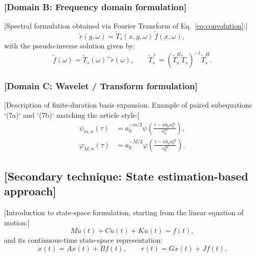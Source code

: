 \documentclass[final,5p,times,twocolumn]{elsarticle}
\begin{document}
\subsubsection{[Domain B: Frequency domain formulation]}\label{subsubsec:sec2_1_2}

[Spectral formulation obtained via Fourier Transform of Eq.~\eqref{eq:convolution}:]
\begin{equation}\label{eq:freq}
    \tilde{r}(y,\omega) = \tilde{T}_{s}(x,y,\omega)\,\tilde{f}(x,\omega),
\end{equation}
with the pseudo-inverse solution given by:
\begin{equation}\label{eq:pinv}
    \tilde{f}(\omega) = \tilde{T}_{s}(\omega)^{+} \tilde{r}(\omega),
    \qquad
    \tilde{T}_{s}^{+} = (\tilde{T}_{s}^{H}\tilde{T}_{s})^{-1}\tilde{T}_{s}^{H}.
\end{equation}

\subsubsection{[Domain C: Wavelet / Transform formulation]}\label{subsubsec:sec2_1_3}

[Description of finite-duration basis expansion. Example of paired subequations `(7a)` and `(7b)` matching the article style:]
\begin{subequations}\label{eq:wavelet_basis}
\begin{align}
    \psi_{m,n}(\tau) &= a_{0}^{-m/2}\psi\!\left(\frac{\tau - n b_{0} a_{0}^{m}}{a_{0}^{m}}\right), \label{eq:wavelet_a} \\
    \varphi_{M,n}(\tau) &= a_{0}^{-M/2}\varphi\!\left(\frac{\tau - n b_{0} a_{0}^{M}}{a_{0}^{M}}\right). \label{eq:wavelet_b}
\end{align}
\end{subequations}

\subsection{[Secondary technique: State estimation-based approach]}\label{subsec:sec2_2}

[Introduction to state-space formulation, starting from the linear equation of motion:]
\begin{equation}\label{eq:eom}
    M\ddot{u}(t) + C\dot{u}(t) + K u(t) = f(t),
\end{equation}
and its continuous-time state-space representation:
\begin{equation}\label{eq:ss}
    \dot{x}(t) = A x(t) + B f(t), \qquad r(t) = G x(t) + J f(t).
\end{equation}
\end{document}

